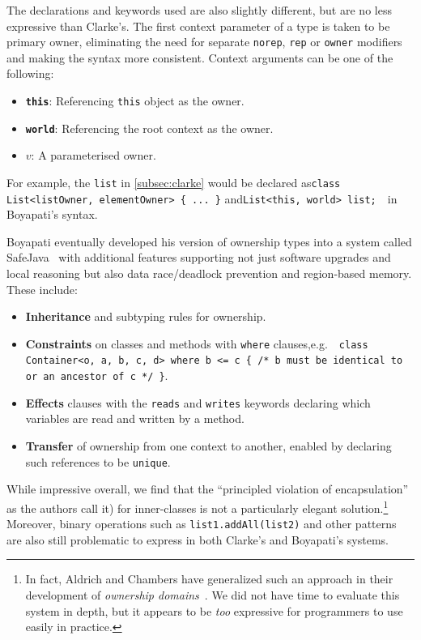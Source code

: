 \documentclass{acm_proc_article-sp}
\begin{document}
The declarations and keywords used are also slightly different, but are no less
expressive than Clarke's. The first context parameter of a type is taken to be
primary owner, eliminating the need for separate \lstinline|norep|,
\lstinline|rep| or \lstinline|owner| modifiers and making the syntax more
consistent. Context arguments can be one of the following:
\begin{itemize}
	\item \textbf{\lstinline|this|}:
		Referencing \lstinline|this| object as the owner.
	\item \textbf{\lstinline|world|}:
		Referencing the root context as the owner.
	\item \textbf{$v$}:
		A parameterised owner.
\end{itemize}

For example, the \lstinline|list| in \cref{subsec:clarke} would be declared
as\linebreak\lstinline|class List<listOwner, elementOwner> { ... }|
and\linebreak\lstinline|List<this, world> list;|~~in Boyapati's syntax.

Boyapati eventually developed his version of ownership types into a system
called SafeJava~\cite{boyapati04safejava} with additional features supporting
not just software upgrades and local reasoning but also data race/deadlock
prevention and region-based memory. These include:
\begin{itemize}
	\item \textbf{Inheritance} and subtyping rules for ownership.
	\item \textbf{Constraints} on classes and methods with \lstinline|where|
clauses,\linebreak e.g.~~\lstinline|class Container<o, a, b, c, d> where b <= c { /* b must be identical to or an ancestor of c */ }|.
	\item \textbf{Effects} clauses with the \lstinline|reads| and
\lstinline|writes| keywords declaring which variables are read and written by a
method.
	\item \textbf{Transfer} of ownership from one context to another, enabled by
declaring such references to be \lstinline|unique|.
\end{itemize}

While impressive overall, we find that the ``principled violation of
encapsulation'' as the authors call it) for inner-classes is not a particularly
elegant solution.\footnote{In fact, Aldrich and Chambers have generalized such
an approach in their development of \emph{ownership
domains}~\cite{aldrich04domains}. We did not have time to evaluate this system
in depth, but it appears to be \emph{too} expressive for programmers to use
easily in practice.} Moreover, binary operations such as
\linebreak\lstinline|list1.addAll(list2)| and other patterns are also still
problematic to express in both Clarke's and Boyapati's systems.
\end{document}
